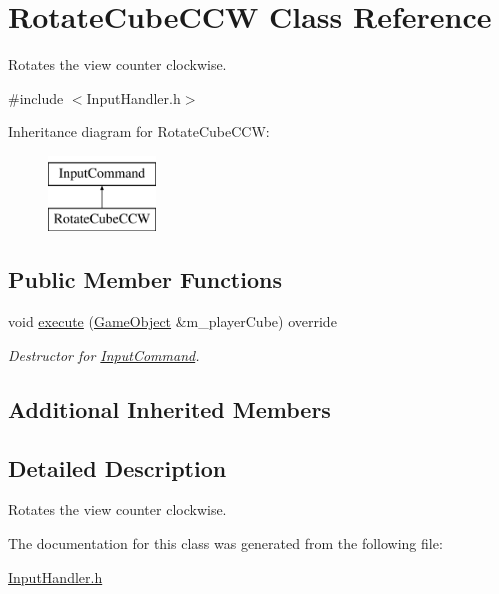 \hypertarget{class_rotate_cube_c_c_w}{}\section{Rotate\+Cube\+C\+CW Class Reference}
\label{class_rotate_cube_c_c_w}


Rotates the view counter clockwise.  




{\ttfamily \#include $<$Input\+Handler.\+h$>$}

Inheritance diagram for Rotate\+Cube\+C\+CW\+:\begin{figure}[H]
\begin{center}
\leavevmode
\includegraphics[height=2.000000cm]{class_rotate_cube_c_c_w}
\end{center}
\end{figure}
\subsection*{Public Member Functions}
\begin{DoxyCompactItemize}
\item 
\mbox{\label{class_rotate_cube_c_c_w_aea041b2fed46215e62222e2ee9a5f6d0}} 
void \mbox{\hyperlink{class_rotate_cube_c_c_w_aea041b2fed46215e62222e2ee9a5f6d0}{execute}} (\mbox{\hyperlink{class_game_object}{Game\+Object}} \&m\+\_\+player\+Cube) override
\begin{DoxyCompactList}\small\item\em Destructor for \mbox{\hyperlink{class_input_command}{Input\+Command}}. \end{DoxyCompactList}\end{DoxyCompactItemize}
\subsection*{Additional Inherited Members}


\subsection{Detailed Description}
Rotates the view counter clockwise. 

The documentation for this class was generated from the following file\+:\begin{DoxyCompactItemize}
\item 
\mbox{\hyperlink{_input_handler_8h}{Input\+Handler.\+h}}\end{DoxyCompactItemize}
